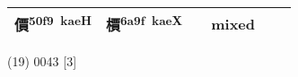 \documentclass[14pt,a4paper]{scrartcl}
\begin{document}
\begin{longtable}[c]{@{}llllll@{}}
\begin{minipage}[t]{0.14\columnwidth}\raggedright\strut
價\textsuperscript{50f9~kaeH}
\strut\end{minipage} &
\begin{minipage}[t]{0.14\columnwidth}\raggedright\strut
檟\textsuperscript{6a9f~kaeX}
\strut\end{minipage} &
\begin{minipage}[t]{0.14\columnwidth}\raggedright\strut
\strut\end{minipage} &
\begin{minipage}[t]{0.14\columnwidth}\raggedright\strut
mixed
\strut\end{minipage}\tabularnewline
\bottomrule
\end{longtable}

(19) 0043 {[}3{]}
\end{document}
